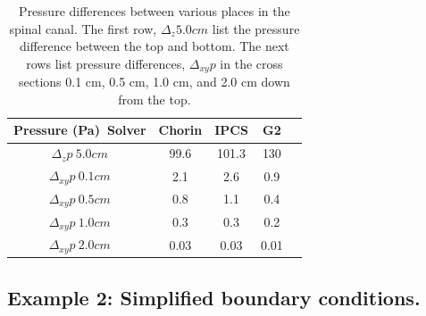\begin{table}
\begin{center}
\begin{tabular}{|c|c|c|c|c|} \hline
Pressure (Pa)\ Solver & Chorin & IPCS & G2 \\ \hline    
$\Delta_z p \ 5.0 cm$  & 99.6 & 101.3 & 130     \\ \hline    
$\Delta_{xy} p  \ 0.1 cm$  &  2.1 & 2.6 & 0.9     \\ \hline    
$\Delta_{xy}  p  \ 0.5 cm$  & 0.8 & 1.1 & 0.4     \\ \hline    
$\Delta_{xy}  p  \ 1.0 cm$  & 0.3 & 0.3 & 0.2     \\ \hline    
$\Delta_{xy}  p  \ 2.0 cm$  &  0.03 & 0.03 & 0.01     \\ \hline    
\end{tabular}
\label{solvers:pressurediff}
\caption{Pressure differences between various places in the spinal canal. 
The first row, $\Delta_z 5.0 cm$ list the pressure difference between the top
and bottom. The next rows list pressure differences, $\Delta_{xy}  p$ in
the cross sections 0.1 cm, 0.5 cm, 1.0 cm, and 2.0 cm down from the top. }
\end{center}
\end{table}






\subsection{Example 2: Simplified boundary conditions.}

